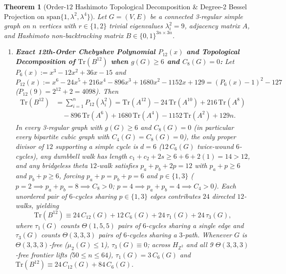 \documentclass[10pt,a4paper]{article}
\newtheorem{theorem}{Theorem}[section]
\theoremstyle{definition}
\theoremstyle{remark}
\begin{document}
\begin{theorem}[Order-$12$ Hashimoto Topological Decomposition \& Degree-2 Bessel Projection on $\mathrm{span}\{1, \lambda^2, \lambda^4\}$]\label{thm:b12_bessel}
Let $G = (V, E)$ be a connected 3-regular simple graph on $n$ vertices with $r \in \{1, 2\}$ trivial eigenvalues $\lambda_i^2 = 9$, adjacency matrix $A$, and Hashimoto non-backtracking matrix $B \in \{0,1\}^{3n \times 3n}$.
\begin{enumerate}[label=(\alph*),nosep]
  \item \textbf{Exact 12th-Order Chebyshev Polynomial $P_{12}(x)$ and Topological Decomposition of $\mathrm{Tr}(B^{12})$ when $g(G) \ge 6$ and $C_8(G) = 0$:}
  Let $P_6(x) := x^3 - 12x^2 + 36x - 15$ and $P_{12}(x) := x^6 - 24x^5 + 216x^4 - 896x^3 + 1680x^2 - 1152x + 129 = (P_6(x) - 1)^2 - 127$ ($P_{12}(9) = 2^{12} + 2 = 4098$). Then
  \begin{equation}\label{eq:trb12}
  \begin{aligned}
    \mathrm{Tr}(B^{12}) &= \sum_{i=1}^n P_{12}(\lambda_i^2) = \mathrm{Tr}(A^{12}) - 24\,\mathrm{Tr}(A^{10}) + 216\,\mathrm{Tr}(A^8) \\
    &\quad - 896\,\mathrm{Tr}(A^6) + 1680\,\mathrm{Tr}(A^4) - 1152\,\mathrm{Tr}(A^2) + 129n.
  \end{aligned}
  \end{equation}
  In every 3-regular graph with $g(G) \ge 6$ and $C_8(G) = 0$ (in particular every bipartite cubic graph with $C_4(G) = C_8(G) = 0$), the only proper divisor of $12$ supporting a simple cycle is $d = 6$ ($12\,C_6(G)$ twice-wound $6$-cycles), any dumbbell walk has length $c_1 + c_2 + 2s \ge 6 + 6 + 2(1) = 14 > 12$, and any bridgeless theta $12$-walk satisfies $p_a + p_b + 2p = 12$ with $p_a + p \ge 6$ and $p_b + p \ge 6$, forcing $p_a + p = p_b + p = 6$ and $p \in \{1, 3\}$ ($p = 2 \implies p_a + p_b = 8 \implies C_8 > 0$; $p = 4 \implies p_a + p_b = 4 \implies C_4 > 0$). Each unordered pair of $6$-cycles sharing $p \in \{1, 3\}$ edges contributes $24$ directed $12$-walks, yielding
  \begin{equation}\label{eq:trb12_topo}
    \mathrm{Tr}(B^{12}) \equiv 24\,C_{12}(G) + 12\,C_6(G) + 24\,\tau_1(G) + 24\,\tau_3(G),
  \end{equation}
  where $\tau_1(G)$ counts $\Theta(1,5,5)$ pairs of $6$-cycles sharing a single edge and $\tau_3(G)$ counts $\Theta(3,3,3)$ pairs of $6$-cycles sharing a $3$-path. Whenever $G$ is $\Theta(3,3,3)$-free ($\mu_2(G) \le 1$), $\tau_3(G) \equiv 0$; across $H_{\mathbb{Z}^2}$ and all 9 $\Theta(3,3,3)$-free frontier lifts ($50 \le n \le 64$), $\tau_1(G) = 3\,C_6(G)$ and $\mathrm{Tr}(B^{12}) \equiv 24\,C_{12}(G) + 84\,C_6(G)$.

\end{enumerate}
\end{theorem}
\end{document}
